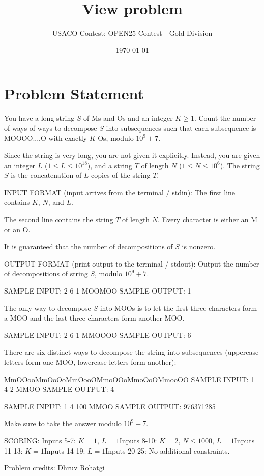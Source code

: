 \documentclass[12pt]{article}
\title{View problem}
\author{USACO Contest: OPEN25 Contest - Gold Division}
\date{\today}
\begin{document}
\maketitle

\section*{Problem Statement}


You have a long string $S$ of Ms and Os and an integer $K \geq 1$. Count the
number of ways of ways to decompose $S$ into subsequences such that each
subsequence is MOOOO....O with exactly $K$ Os, modulo $10^9+7$.

Since the string is very long, you are not given it explicitly. Instead, you are
given an integer $L$ ($1 \leq L \leq 10^{18}$), and a string $T$ of length $N$
($1 \leq N \leq 10^6$). The string $S$ is the concatenation of $L$ copies of the
string $T$. 

INPUT FORMAT (input arrives from the terminal / stdin):
The first line contains $K$, $N$, and $L$.

The second line contains the string $T$ of length $N$. Every character is either
an M or an O.

It is guaranteed that the number of decompositions of $S$ is nonzero.


OUTPUT FORMAT (print output to the terminal / stdout):
Output the number of decompositions of string $S$, modulo $10^9+7$. 

SAMPLE INPUT:
2 6 1
MOOMOO
SAMPLE OUTPUT: 
1

The only way to decompose $S$ into MOOs is to let the first three characters form a MOO and
the last three characters form another MOO.

SAMPLE INPUT:
2 6 1
MMOOOO
SAMPLE OUTPUT: 
6

There are six distinct ways to decompose the string into subsequences (uppercase
letters form one MOO, lowercase letters form another):

MmOOooMmOoOoMmOooOMmoOOoMmoOoOMmooOO
SAMPLE INPUT:
1 4 2
MMOO
SAMPLE OUTPUT: 
4

SAMPLE INPUT:
1 4 100
MMOO
SAMPLE OUTPUT: 
976371285

Make sure to take the answer modulo $10^9+7$.

SCORING:
Inputs 5-7: $K=1$, $L = 1$Inputs 8-10: $K=2$, $N\leq 1000$, $L = 1$Inputs 11-13: $K=1$Inputs 14-19: $L = 1$Inputs 20-25: No additional constraints.


Problem credits: Dhruv Rohatgi
\end{document}

